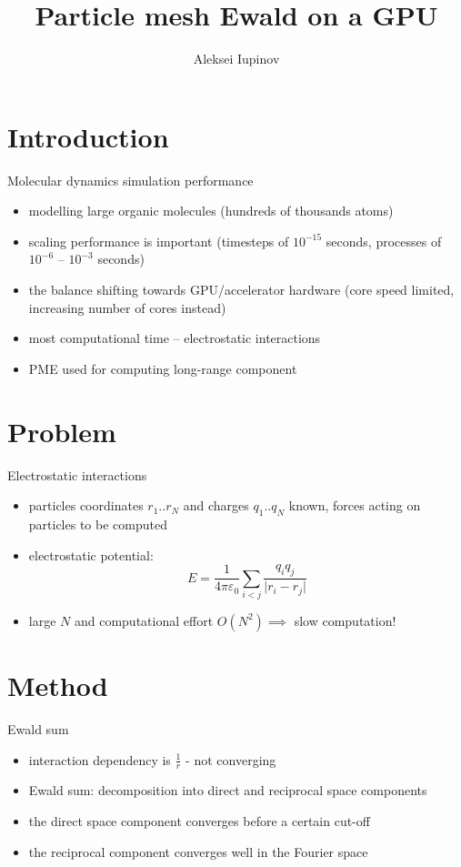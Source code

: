\documentclass[11pt]{beamer}
\author{Aleksei Iupinov}
\title{Particle mesh Ewald on a GPU}
\institute{KTH Royal Institute of Technology}
\begin{document}
\begin{frame}
\titlepage
\end{frame}

\begin{frame}
\tableofcontents
\end{frame}

\section{Introduction}
\begin{frame}{Molecular dynamics simulation performance}
\begin{itemize}
\item modelling large organic molecules (hundreds of thousands atoms)
\item scaling performance is important (timesteps of $10^{-15}$ seconds, processes of $10^{-6}$ -- $10^{-3}$ seconds) 
\item the balance shifting towards GPU/accelerator hardware (core speed limited, increasing number of cores instead)
\item most computational time -- electrostatic interactions
\item PME used for computing long-range component
\end{itemize}
\end{frame}

\section{Problem}
\begin{frame}{Electrostatic interactions}
\begin{itemize}
\item particles coordinates $r_1 .. r_N$ and charges $q_1 .. q_N$ known, forces acting on particles to be computed 
\item electrostatic potential:
\[E = \frac{1}{4 \pi \varepsilon_0}\sum\limits_{i < j}\frac{q_i q_j}{\lvert r_i-r_j\rvert}\]
\item large $N$ and computational effort $O(N^2) \implies$ slow computation!
\end{itemize}
\end{frame}

\section{Method}
\begin{frame}{Ewald sum}
\begin{itemize}
\item interaction dependency is $\frac{1}{r}$ - not converging
\item Ewald sum: decomposition into direct and reciprocal space components
\item the direct space component converges before a certain cut-off
\item the reciprocal component converges well in the Fourier space
\end{itemize}
\end{frame}
\end{document}
